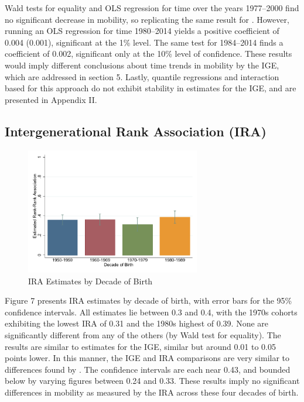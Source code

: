 \documentclass[notitlepage,12pt]{article}
\begin{document}
Wald tests for equality and OLS regression for time over the years 1977--2000 find no significant decrease in mobility, so replicating the same result for \cite{lee2009trends}.  However, running an OLS regression for time 1980--2014 yields a positive coefficient of 0.004 (0.001), significant at the 1\% level.  The same test for 1984--2014 finds a coefficient of 0.002, significant only at the 10\% level of confidence.  These results would imply different conclusions about time trends in mobility by the IGE, which are addressed in section 5.  Lastly, quantile regressions and interaction based for this approach do not exhibit stability in estimates for the IGE, and are presented in Appendix II.

\subsection{Intergenerational Rank Association (IRA)}
\begin{figure}[H]
  \centering
  \caption{IRA Estimates by Decade of Birth}
  \includegraphics[width=3in]{Graph9.pdf}
\end{figure}
Figure 7 presents IRA estimates by decade of birth, with error bars for the 95\% confidence intervals.  All estimates lie between 0.3 and 0.4, with the 1970s cohorts exhibiting the lowest IRA of 0.31 and the 1980s highest of 0.39.  None are significantly different from any of the others (by Wald test for equality).  The results are similar to estimates for the IGE, similar but around 0.01 to 0.05 points lower.  In this manner, the IGE and IRA comparisons are very similar to differences found by \cite{dahl2008association}.  The confidence intervals are each near 0.43, and bounded below by varying figures between 0.24 and 0.33.  These results imply no significant differences in mobility as measured by the IRA across these four decades of birth.  
\end{document}
